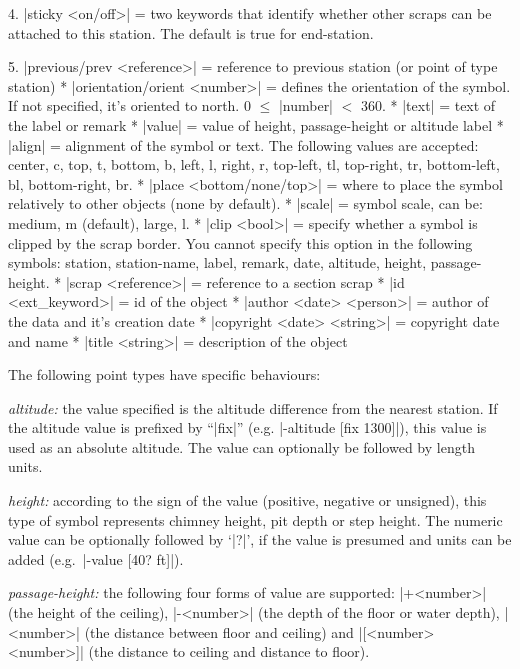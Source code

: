     4. |sticky <on/off>| = two keywords that identify whether other
       scraps can be attached to this station. The default is true for
       end-station.

    5. |previous/prev <reference>| = reference to previous station
       (or point of type station)
  * |orientation/orient <number>| = defines the orientation
    of the symbol. If not specified, it's oriented to north.
    0 $\le$ |number| $<$ 360.
  * |text| = text of the label or remark
  * |value| = value of height, passage-height or altitude label
  * |align| = alignment of the symbol or text. The following values
    are accepted: center, c, top, t, bottom, b, left, l, right, r,
    top-left, tl, top-right, tr, bottom-left, bl, bottom-right, br.
  * |place <bottom/none/top>| = where to place the symbol relatively
    to other objects (none by default).
  * |scale| = symbol scale, can be: medium, m (default), large, l.
  * |clip <bool>| = specify whether a symbol is clipped by the scrap border.
    You cannot specify this option in the following symbols: station,
    station-name, label, remark, date, altitude, height, passage-height.
  * |scrap <reference>| = reference to a section scrap
  * |id <ext_keyword>| = id of the object
  * |author <date> <person>| = author of the data and it's creation date
  * |copyright <date> <string>| = copyright date and name
  * |title <string>| = description of the object
\endoptions

\notes
   The following point types have specific behaviours:
        
   \list
      {\it altitude:} the value specified is the altitude difference from 
      the nearest station. If the altitude value is prefixed by ``|fix|''
      (e.g. |-altitude [fix 1300]|), this value is used as an absolute altitude. 
      The value can optionally be followed by length units.
        
      {\it height:} according to the sign of the value (positive, negative or
      unsigned), this type of symbol represents chimney height, pit depth
      or step height. The numeric value can be optionally followed by `|?|', 
      if the value is presumed and units can be added 
      (e.g.~|-value [40? ft]|).
        
      {\it passage-height:} the following four forms of value are supported:
      |+<number>| (the height of the ceiling), |-<number>| (the depth of the 
      floor or water depth), |<number>| (the distance between floor 
      and ceiling) and |[<number> <number>]| (the distance to ceiling and 
      distance to floor).
        
